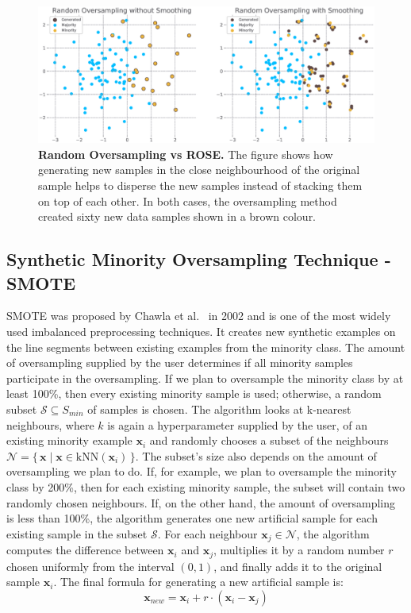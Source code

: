 \begin{figure}
    \centering
    \includegraphics[width=\linewidth]{figures/random_oversampling_vs_rose.eps}
    \caption{
        \textbf{Random Oversampling vs ROSE.} The figure shows how generating new samples in the
        close neighbourhood of the original sample helps to disperse the new samples instead of
        stacking them on top of each other. In both cases, the oversampling method created sixty
        new data samples shown in a brown colour.
    }
    \label{figure:random-oversampling}
\end{figure}


\subsection{Synthetic Minority Oversampling Technique - SMOTE}
\label{subsection:smote}

SMOTE was proposed by Chawla et al.~\cite{smote} in 2002 and is one of the most widely used
imbalanced preprocessing techniques. It creates new synthetic examples on the line segments between
existing examples from the minority class. The amount of oversampling supplied by the user
determines if all minority samples participate in the oversampling. If we plan to oversample the
minority class by at least 100\%, then every existing minority sample is used; otherwise, a random
subset $\mathcal{S} \subseteq {S_{min}}$ of samples is chosen. The algorithm looks at k-nearest
neighbours, where $k$ is again a hyperparameter supplied by the user, of an existing minority
example $\mathbf{x}_i$ and randomly chooses a subset of the neighbours $\mathcal{N} =
\{\,\mathbf{x} \mid \mathbf{x} \in \mathrm{kNN}(\mathbf{x}_i)\,\}$. The subset's size also depends
on the amount of oversampling we plan to do. If, for example, we plan to oversample the minority
class by 200\%, then for each existing minority sample, the subset will contain two randomly chosen
neighbours. If, on the other hand, the amount of oversampling is less than 100\%, the algorithm
generates one new artificial sample for each existing sample in the subset $\mathcal{S}$. For each
neighbour $\mathbf{x}_j \in \mathcal{N}$, the algorithm computes the difference between
$\mathbf{x}_i$ and $\mathbf{x}_j$, multiplies it by a random number $r$ chosen uniformly from the
interval $(0, 1)$, and finally adds it to the original sample $\mathbf{x}_i$. The final formula for
generating a new artificial sample is:
\begin{equation}
    \mathbf{x}_{new} = \mathbf{x}_i + r \cdot (\mathbf{x}_i - \mathbf{x}_j)
    \label{equation:smote}
\end{equation}


